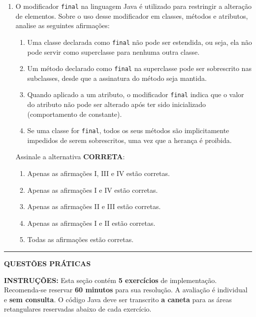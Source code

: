 \documentclass[12pt,a4paper]{article}
\newcommand{\resposta}[1]{
\noindent
\framebox[\textwidth]{
\begin{minipage}{0.98\textwidth}
\vspace{#1}
\end{minipage}
}
}
\begin{document}
\begin{enumerate}
    \resposta{5cm}

    \item O modificador \texttt{final} na linguagem Java é utilizado para restringir a alteração de elementos. Sobre o uso desse modificador em classes, métodos e atributos, analise as seguintes afirmações:

    \begin{enumerate}[label=\Roman*.]
        \item Uma classe declarada como \texttt{final} não pode ser estendida, ou seja, ela não pode servir como superclasse para nenhuma outra classe.
        \item Um método declarado como \texttt{final} na superclasse pode ser sobrescrito nas subclasses, desde que a assinatura do método seja mantida.
        \item Quando aplicado a um atributo, o modificador \texttt{final} indica que o valor do atributo não pode ser alterado após ter sido inicializado (comportamento de constante).
        \item Se uma classe for \texttt{final}, todos os seus métodos são implicitamente impedidos de serem sobrescritos, uma vez que a herança é proibida.
    \end{enumerate}

    Assinale a alternativa \textbf{CORRETA}:

    \begin{enumerate}[label=\Alph*)]
        \item Apenas as afirmações I, III e IV estão corretas.
        \item Apenas as afirmações I e IV estão corretas.
        \item Apenas as afirmações II e III estão corretas.
        \item Apenas as afirmações I e II estão corretas.
        \item Todas as afirmações estão corretas.
    \end{enumerate}

\end{enumerate}
\vspace{0.5cm}
\newpage
\begin{center}
    \rule{\textwidth}{0.4pt}
    \textbf{QUESTÕES PRÁTICAS}
\end{center}

\vspace{0.2cm}

\textbf{INSTRUÇÕES:} Esta seção contém \textbf{5 exercícios} de implementação. Recomenda-se reservar \textbf{60 minutos} para sua resolução. A avaliação é individual e \textbf{sem consulta}. O código Java deve ser transcrito \textbf{a caneta} para as áreas retangulares reservadas abaixo de cada exercício.
\end{document}
